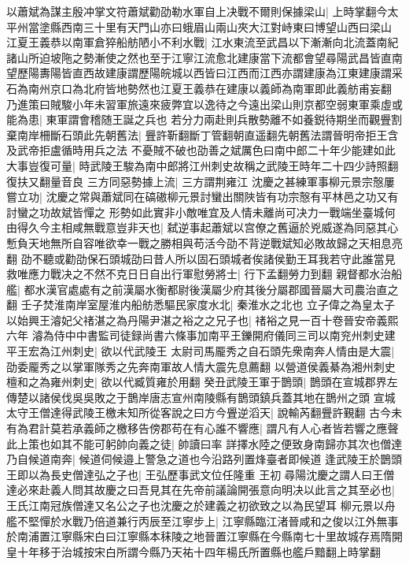 以蕭斌為謀主殷冲掌文符蕭斌勸劭勒水軍自上决戰不爾則保據梁山|{
	上時掌翻今太平州當塗縣西南三十里有天門山亦曰蛾眉山兩山夾大江對峙東曰博望山西曰梁山}
江夏王義恭以南軍倉猝船舫陋小不利水戰|{
	江水東流至武昌以下漸漸向北流蓋南紀諸山所迫坡陁之勢漸使之然也至于江寧江流愈北建康當下流都會望尋陽武昌皆直南望歷陽夀陽皆直西故建康謂歷陽皖城以西皆曰江西而江西亦謂建康為江東建康謂采石為南州京口為北府皆地勢然也江夏王義恭在建康以義師為南軍即此義舫甫妄翻}
乃進策曰賊駿小年未習軍旅遠來疲弊宜以逸待之今遠出梁山則京都空弱東軍乘虛或能為患|{
	東軍謂會稽随王誕之兵也}
若分力兩赴則兵散勢離不如養鋭待期坐而觀舋割棄南岸柵斷石頭此先朝舊法|{
	舋許靳翻斷丁管翻朝直遥翻先朝舊法謂晉明帝拒王含及武帝拒盧循時用兵之法}
不憂賊不破也劭善之斌厲色曰南中郎二十年少能建如此大事豈復可量|{
	時武陵王駿為南中郎將江州刺史故稱之武陵王時年二十四少詩照翻復扶又翻量音良}
三方同惡勢據上流|{
	三方謂荆雍江}
沈慶之甚練軍事柳元景宗慤屢嘗立功|{
	沈慶之常與蕭斌同在碻磝柳元景討蠻出關陜皆有功宗慤有平林邑之功又有討蠻之功故斌皆憚之}
形勢如此實非小敵唯宜及人情未離尚可决力一戰端坐臺城何由得久今主相咸無戰意豈非天也|{
	弑逆事起蕭斌以宫僚之舊逼於兇威遂為同惡其心慙負天地無所自容唯欲幸一戰之勝相與苟活今劭不背逆戰斌知必敗故歸之天相息亮翻}
劭不聽或勸劭保石頭城劭曰昔人所以固石頭城者俟諸侯勤王耳我若守此誰當見救唯應力戰决之不然不克日日自出行軍慰勞將士|{
	行下孟翻勞力到翻}
親督都水治船艦|{
	都水漢官處處有之前漢屬水衡都尉後漢屬少府其後分屬郡國晉屬大司農治直之翻}
壬子焚淮南岸室屋淮内船舫悉驅民家度水北|{
	秦淮水之北也}
立子偉之為皇太子以始興王濬妃父禇湛之為丹陽尹湛之裕之之兄子也|{
	禇裕之見一百十卷晉安帝義熙六年}
濬為侍中中書監司徒録尚書六條事加南平王鑠開府儀同三司以南兖州刺史建平王宏為江州刺史|{
	欲以代武陵王}
太尉司馬龎秀之自石頭先衆南奔人情由是大震|{
	劭委龎秀之以掌軍隊秀之先奔南軍故人情大震先息薦翻}
以營道侯義綦為湘州刺史檀和之為雍州刺史|{
	欲以代臧質雍於用翻}
癸丑武陵王軍于鵲頭|{
	鵲頭在宣城郡界左傳楚以諸侯伐吳吳敗之于鵲岸唐志宣州南陵縣有鵲頭鎮兵蓋其地在鵲州之頭}
宣城太守王僧達得武陵王檄未知所從客說之曰方今舋逆滔天|{
	說輸芮翻舋許覲翻}
古今未有為君計莫若承義師之檄移告傍郡苟在有心誰不響應|{
	謂凡有人心者皆若響之應聲}
此上策也如其不能可躬帥向義之徒|{
	帥讀曰率}
詳擇水陸之便致身南歸亦其次也僧達乃自候道南奔|{
	候道伺候邉上警急之道也今沿路列置烽臺者即候道}
逢武陵王於鵲頭王即以為長史僧達弘之子也|{
	王弘歷事武文位任隆重}
王初尋陽沈慶之謂人曰王僧達必來赴義人問其故慶之曰吾見其在先帝前議論開張意向明决以此言之其至必也|{
	王氏江南冠族僧達又名公之子也沈慶之於建義之初欲致之以為民望耳}
柳元景以舟艦不堅憚於水戰乃倍道兼行丙辰至江寧步上|{
	江寧縣臨江渚晉咸和之俊以江外無事於南浦置江寧縣宋白曰江寧縣本秣陵之地晉置江寧縣在今縣南七十里故城存焉隋開皇十年移于治城按宋白所謂今縣乃天祐十四年楊氏所置縣也艦戶黯翻上時掌翻}
